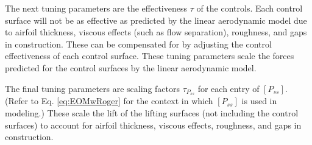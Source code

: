 The next tuning parameters are the effectiveness $\tau$ of the controls. Each control surface will not be as effective as predicted by the linear aerodynamic model due to airfoil thickness, viscous effects (such as flow separation), roughness, and gaps in construction. These can be compensated for by adjusting the control effectiveness of each control surface. These tuning parameters scale the forces predicted for the control surfaces by the linear aerodynamic model.

The final tuning parameters are scaling factors $\tau_{P_{ss}}$ for each entry of $[P_{ss}]$. (Refer to Eq. \ref{eq:EOMwRoger} for the context in which $[P_{ss}]$ is used in modeling.) These scale the lift of the lifting surfaces (not including the control surfaces) to account for airfoil thickness, viscous effects, roughness, and gaps in construction.


